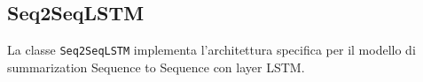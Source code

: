 \subsection{Seq2SeqLSTM}
La classe \texttt{Seq2SeqLSTM} implementa l'architettura specifica per il modello di summarization Sequence to Sequence con layer LSTM.

